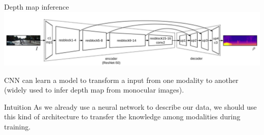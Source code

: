 \begin{frame}{Depth map inference}	
	\includegraphics[width=\linewidth]{images/kusnietzov.png}				
	
	\cite{Kuznietsov2017}
	
	CNN can learn a model to transform a input from one modality to another (widely used to infer depth map from monocular images).
	\vfill
	\begin{block}{Intuition}
		As we already use a neural network to describe our data, we should use this kind of architecture to transfer the knowledge among modalities during training.
	\end{block}	 	
	
\end{frame}

